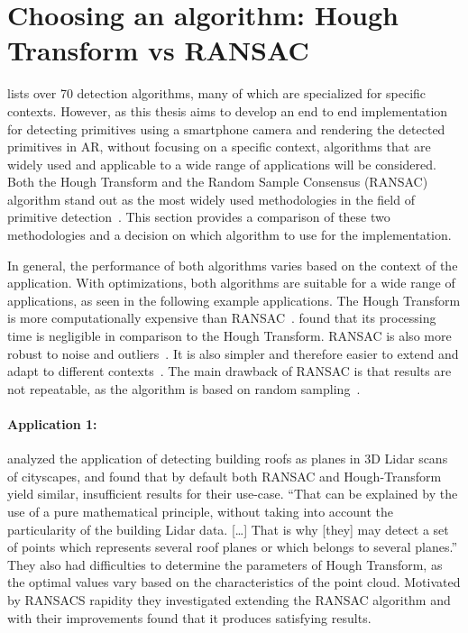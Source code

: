 \section{Choosing an algorithm: Hough Transform vs RANSAC}

\cite{kaiser_survey_2019} lists over 70 detection algorithms, many of which are specialized for specific contexts.
However, as this thesis aims to develop an end to end implementation for detecting primitives using
a smartphone camera and rendering the detected primitives in AR, without focusing on a specific context,
algorithms that are widely used and applicable to a wide range of applications will be considered.
Both the Hough Transform and the Random Sample Consensus (RANSAC) algorithm stand out as the
most widely used methodologies in the field of primitive detection~\parencite{schnabel_efficient_2007}.
This section provides a comparison of these two methodologies and a decision on which algorithm to use for the implementation.

In general, the performance of both algorithms varies based on the context of the application.
With optimizations, both algorithms are suitable for a wide range of applications, as seen in the following example applications.
The Hough Transform is more computationally expensive than RANSAC~\parencite{kaiser_survey_2019}.
\cite{tarsha-kurdi_hough-transform_2007} found that its processing time is negligible in comparison to the Hough Transform.
RANSAC is also more robust to noise and outliers~\parencite{kaiser_survey_2019}.
It is also simpler and therefore easier to extend and adapt to different contexts~\parencite{tarsha-kurdi_hough-transform_2007, kaiser_survey_2019}.
The main drawback of RANSAC is that results are not repeatable, as the algorithm is based on random sampling~\parencite{kaiser_survey_2019}.


\paragraph{Application 1:}
\cite{tarsha-kurdi_hough-transform_2007} analyzed the application of detecting building
roofs as planes in 3D Lidar scans of cityscapes, and found that by default both RANSAC and Hough-Transform yield similar,
insufficient results for their use-case.
“That can be explained by the use of a pure mathematical principle,
without taking into account the particularity of the building Lidar data. […] That is why
[they] may detect a set of points which represents several roof planes or which belongs to several planes.”
They also had difficulties to determine the parameters of Hough Transform,
as the optimal values vary based on the characteristics of the point cloud.
Motivated by RANSACS rapidity they investigated extending the RANSAC algorithm and with their improvements
found that it produces satisfying results.

